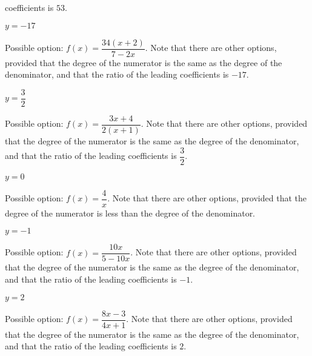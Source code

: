 \begin{exercises}
\begin{problem}
\begin{multicols}{4}
\begin{subproblem}
\begin{shortsolution}
        coefficients is $53$.
        \end{shortsolution}
    \end{subproblem}
    \begin{subproblem}
        $y=-17$ 
        \begin{shortsolution}
        Possible option: $f(x)=\dfrac{34(x+2)}{7-2x}$. Note that there
        are other options, provided that the degree of the numerator is the same as the degree
        of the denominator, and that the ratio of the leading 
        coefficients is $-17$.
        \end{shortsolution}
    \end{subproblem}
    \begin{subproblem}
        $y=\dfrac{3}{2}$ 
        \begin{shortsolution}
        Possible option: $f(x)=\dfrac{3x+4}{2(x+1)}$. Note that there
        are other options, provided that the degree of the numerator is the same as the degree
        of the denominator, and that the ratio of the leading 
        coefficients is $\dfrac{3}{2}$.
        \end{shortsolution}
    \end{subproblem}
    \begin{subproblem}
        $y=0$ 
        \begin{shortsolution}
        Possible option: $f(x)=\dfrac{4}{x}$. Note that there
        are other options, provided that the degree of the numerator is less than the degree
        of the denominator.
       \end{shortsolution}
    \end{subproblem}
    \begin{subproblem}
        $y=-1$ 
        \begin{shortsolution}
        Possible option: $f(x)=\dfrac{10x}{5-10x}$. Note that there
        are other options, provided that the degree of the numerator is the same as the degree
        of the denominator, and that the ratio of the leading 
        coefficients is $-1$.
        \end{shortsolution}
    \end{subproblem}
    \begin{subproblem}
        $y=2$ 
        \begin{shortsolution}
        Possible option: $f(x)=\dfrac{8x-3}{4x+1}$. Note that there
        are other options, provided that the degree of the numerator is the same as the degree
        of the denominator, and that the ratio of the leading 
        coefficients is $2$.
        \end{shortsolution}
    \end{subproblem}
\end{multicols}
\end{problem}


\end{exercises}
